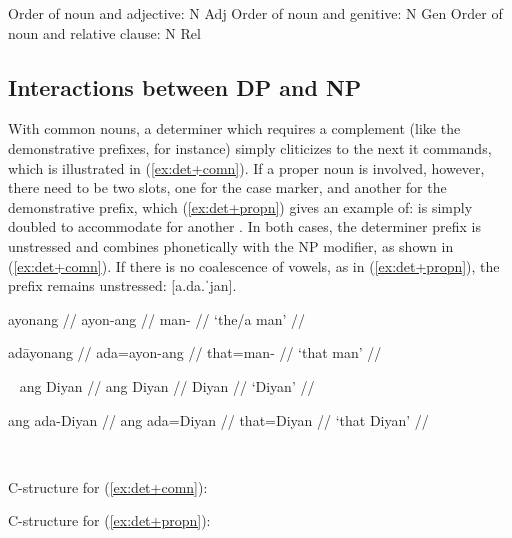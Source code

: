 \pex
\a Order of noun and adjective: N Adj
\a Order of noun and genitive: N Gen
\a Order of noun and relative clause: N Rel
\xe

\subsection{Interactions between DP and NP}
\label{subsec:dpnpinteract}

With common nouns, a determiner which requires a complement (like the
demonstrative prefixes, for instance) simply cliticizes to the next 
it commands, which is illustrated in (\ref{ex:det+comn}). If a proper noun is
involved, however, there need to be two  slots, one for the case
marker, and another for the demonstrative prefix, which (\ref{ex:det+propn})
gives an example of:  is simply doubled to accommodate for another
. In both cases, the determiner prefix is unstressed and combines 
phonetically with the NP modifier, as shown in (\ref{ex:det+comn}). If there is
no coalescence of vowels, as in (\ref{ex:det+propn}), the prefix remains
unstressed:  [a.da.ˈjan].

\begin{multicols}{2}
\pex\label{ex:det+comn}
\a\begingl
	\gla ayonang //
	\glb ayon-ang //
	\glc man-\Aarg{} //
	\glft `the/a man' //
\endgl

\a\begingl
	\gla adāyonang //
	\glb ada=ayon-ang //
	\glc that=man-\Aarg{} //
	\glft `that man' //
\endgl

\xe

\pex~\label{ex:det+propn}
\a\begingl
	\gla ang Diyan //
	\glb ang Diyan //
	\glc \Aarg{} Diyan //
	\glft `Diyan' //
\endgl

\a\label{ex:case+det+propn}\begingl
	\gla ang ada-Diyan //
	\glb ang ada=Diyan //
	\glc \Aarg{} that=Diyan //
	\glft `that Diyan' //
\endgl

\xe

\end{multicols}

\begin{multicols}{2}
\pex~
\a \begin{minipage}[t]{\linewidth}
C-structure for (\ref{ex:det+comn}):\medskip

\end{minipage}

\a \begin{minipage}[t]{\linewidth}
C-structure for (\ref{ex:det+propn}):\medskip

\end{minipage}
\xe
\end{multicols}

